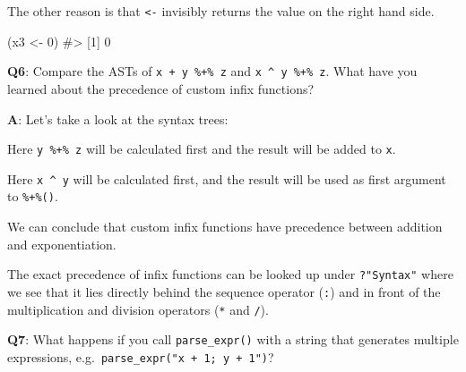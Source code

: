 \documentclass[
]{krantz}
\makeatletter
\newenvironment{Shaded}{\begin{snugshade}}{\end{snugshade}}
\newcommand{\CommentTok}[1]{\textcolor[rgb]{0.56,0.35,0.01}{\textit{#1}}}
\newcommand{\DecValTok}[1]{\textcolor[rgb]{0.00,0.00,0.81}{#1}}
\newcommand{\KeywordTok}[1]{\textcolor[rgb]{0.13,0.29,0.53}{\textbf{#1}}}
\newcommand{\NormalTok}[1]{#1}
\newcommand{\OperatorTok}[1]{\textcolor[rgb]{0.81,0.36,0.00}{\textbf{#1}}}
\newcommand{\StringTok}[1]{\textcolor[rgb]{0.31,0.60,0.02}{#1}}
\newenvironment{kframe}{%
\medskip{}
\setlength{\fboxsep}{.8em}
 \def\at@end@of@kframe{}%
 \ifinner\ifhmode%
  \def\at@end@of@kframe{\end{minipage}}%
  \begin{minipage}{\columnwidth}%
 \fi\fi%
 \def\FrameCommand##1{\hskip\@totalleftmargin \hskip-\fboxsep
 \colorbox{shadecolor}{##1}\hskip-\fboxsep
     \hskip-\linewidth \hskip-\@totalleftmargin \hskip\columnwidth}%
 \MakeFramed {\advance\hsize-\width
   \@totalleftmargin\z@ \linewidth\hsize
   \@setminipage}}%
 {\par\unskip\endMakeFramed%
 \at@end@of@kframe}
\renewenvironment{Shaded}{\begin{kframe}}{\end{kframe}}
\renewcommand{\KeywordTok} [1]{\textcolor[rgb]{0.00,0.44,0.13}{{#1}}}
\renewcommand{\DecValTok}  [1]{\textcolor[rgb]{0.25,0.63,0.44}{{#1}}}
\renewcommand{\StringTok}  [1]{\textcolor[rgb]{0.25,0.44,0.63}{{#1}}}
\renewcommand{\CommentTok} [1]{\textcolor[rgb]{0.38,0.63,0.69}{{#1}}}
\renewcommand{\NormalTok}  [1]{{#1}}
\makeatother
\begin{document}
The other reason is that \texttt{\textless{}-} invisibly returns the value on the right hand side.

\begin{Shaded}
\begin{Highlighting}[]
\NormalTok{(x3 <-}\StringTok{ }\DecValTok{0}\NormalTok{)}
\CommentTok{#> [1] 0}
\end{Highlighting}
\end{Shaded}

\textbf{{Q6}}: Compare the ASTs of \texttt{x\ +\ y\ \%+\%\ z} and \texttt{x\ \^{}\ y\ \%+\%\ z}. What have you learned about the precedence of custom infix functions?

\textbf{{A}}: Let's take a look at the syntax trees:

\begin{Shaded}
\end{Shaded}

Here \texttt{y\ \%+\%\ z} will be calculated first and the result will be added to \texttt{x}.

\begin{Shaded}
\end{Shaded}

Here \texttt{x\ \^{}\ y} will be calculated first, and the result will be used as first argument to \texttt{\%+\%()}.

We can conclude that custom infix functions have precedence between addition and exponentiation.

The exact precedence of infix functions can be looked up under \texttt{?"Syntax"} where we see that it lies directly behind the sequence operator (\texttt{:}) and in front of the multiplication and division operators (\texttt{*} and \texttt{/}).

\textbf{{Q7}}: What happens if you call \texttt{parse\_expr()} with a string that generates multiple expressions, e.g.~\texttt{parse\_expr("x\ +\ 1;\ y\ +\ 1")}?
\end{document}
